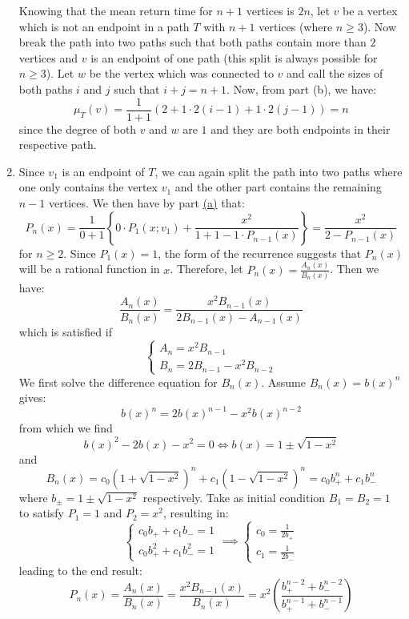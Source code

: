\begin{solution}
\begin{enumerate}[label=(\alph*)]
        Knowing that the mean return time for $n + 1$ vertices is $2n$, let $v$ be a vertex which is not an endpoint in a path $T$ with $n+1$ vertices (where $n\geq 3$). Now break the path into two paths such that both paths contain more than $2$ vertices and $v$ is an endpoint of one path (this split is always possible for $n\geq 3$). Let $w$ be the vertex which was connected to $v$ and call the sizes of both paths $i$ and $j$ such that $i+j=n+1$. Now, from part (b), we have:
        \[
            \mu_T(v) = \frac{1}{1+1}(2+1\cdot 2(i-1) + 1\cdot2(j-1)) = n
        \]
        since the degree of both $v$ and $w$ are $1$ and they are both endpoints in their respective path.
        \item Since $v_1$ is an endpoint of $T$, we can again split the path into two paths where one only contains the vertex $v_1$ and the other part contains the remaining $n-1$ vertices. We then have by part \hyperlink{eq:ch4:3:a}{(a)} that:
        \[
            P_n(x) = \frac{1}{0+1} \left\{0\cdot P_1(x;v_1) + \frac{x^2}{1+1-1\cdot P_{n-1}(x)}\right\} = \frac{x^2}{2-P_{n-1}(x)}
        \]
        for $n\geq2$. Since $P_1(x)=1$, the form of the recurrence suggests that $P_n(x)$ will be a rational function in $x$. Therefore, let $P_n(x) = \frac{A_n(x)}{B_n(x)}$. Then we have:
        \[
            \frac{A_n(x)}{B_n(x)} = \frac{x^2B_{n-1}(x)}{2B_{n-1}(x) - A_{n-1}(x)}
        \]
        which is satisfied if
        \[
            \begin{cases}
                A_n = x^2B_{n-1} \\
                B_n = 2B_{n-1} -x^2B_{n-2}
            \end{cases}
        \]
        We first solve the difference equation for $B_n(x)$. Assume $B_n(x) = b(x)^n$ gives:
        \[
            b(x)^{n} = 2b(x)^{n-1}-x^2b(x)^{n-2}
        \]
        from which we find
        \[
            b(x)^2 - 2b(x) - x^2 = 0 \Longleftrightarrow b(x) = 1\pm \sqrt{1-x^2}
        \]
        and
        \[
            B_n(x) = c_0 \left(1+\sqrt{1-x^2}\right)^n + c_1\left(1-\sqrt{1-x^2}\right)^n = c_0b_+^n + c_1 b_-^n
        \]
        where $b_{\pm} = 1\pm\sqrt{1-x^2}$ respectively. Take as initial condition $B_1 = B_2 = 1$ to satisfy $P_1=1$ and $P_2=x^2$, resulting in:
        \[
            \begin{cases}
                c_0b_+ + c_1b_- = 1 \\
                c_0b_+^2 + c_1b_-^2 =1
            \end{cases} \implies  \begin{cases}
                c_0 = \frac{1}{2b_+} \\
                c_1 = \frac{1}{2b_-}
            \end{cases}
        \]
        leading to the end result:
        \[
            P_n(x) = \frac{A_n(x)}{B_n(x)} =  \frac{x^2B_{n-1}(x)}{B_n(x)} =  x^2 \left(\frac{b_+^{n-2} + b_-^{n-2}}{b_+^{n-1} + b_-^{n-1}}\right) 
        \]
    \end{enumerate}
\end{solution}

